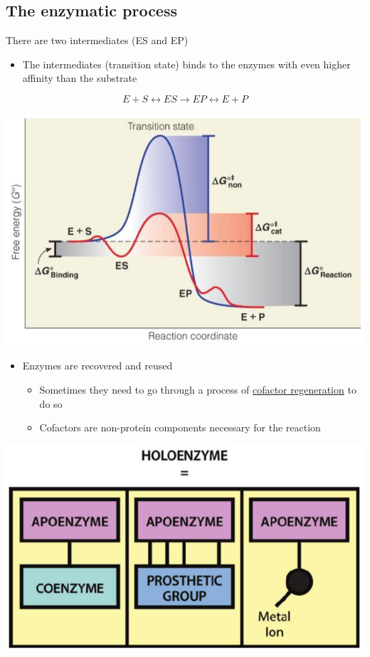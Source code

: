 \documentclass[10pt]{article}
\begin{document}
\subsection*{The enzymatic process}
There are two intermediates (ES and EP)
\begin{itemize}
    \item The intermediates (transition state) binds to the enzymes with even higher affinity than the substrate
\end{itemize}
\[E + S \leftrightarrow ES \rightarrow EP \leftrightarrow E + P\]
\begin{center}
    \includegraphics*[scale=0.8]{L1_7.png}
\end{center}
\begin{itemize}
    \item Enzymes are recovered and reused
    \begin{itemize}
        \item Sometimes they need to go through a process of \underline{cofactor regeneration} to do so
        \item Cofactors are non-protein components necessary for the reaction
    \end{itemize}
\end{itemize}
\begin{center}
    \includegraphics*[scale=0.6]{L1_8.png}
\end{center}
\end{document}

